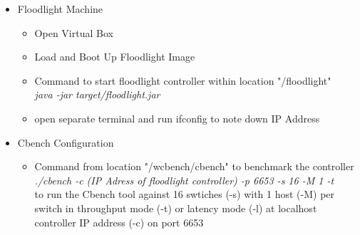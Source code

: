 \begin{itemize}
    
    \item Floodlight Machine 
    
    \begin{itemize}
    
        \item Open Virtual Box
        \item Load and Boot Up Floodlight Image
        \item Command to start floodlight controller within location "/floodlight"\\
        \emph{java -jar target/floodlight.jar}
        \item open separate terminal and run ifconfig to note down IP Address
        
    \end{itemize}
    
    \item Cbench Configuration
    
    \begin{itemize}
    
        \item Command from location "/wcbench/cbench" to benchmark the controller\\
        \emph{./cbench -c (IP Adress of floodlight controller) -p 6653 -s 16 -M 1 -t}\\
        
        to run the Cbench tool against 16 swtiches (-s) with 1 host (-M) per switch in throughput mode (-t) or latency mode (-l)
        at localhost controller IP address (-c)  on port 6653  
    
        \end{itemize}
    
\end{itemize}
